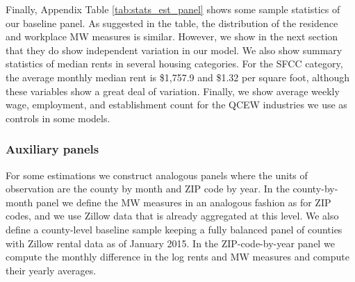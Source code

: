 Finally, Appendix Table \ref{tab:stats_est_panel} shows some sample statistics 
of our baseline panel.
As suggested in the table, the distribution of the residence and workplace MW 
measures is similar.
However, we show in the next section that they do show independent variation
in our model.
We also show summary statistics of median rents in several housing categories.
For the SFCC category, the average monthly median rent is \$1,757.9 and \$1.32 
per square foot, although these variables show a great deal of variation.
Finally, we show average weekly wage, employment, and establishment count 
for the QCEW industries we use as controls in some models.

\subsubsection*{Auxiliary panels}
\label{sec:data_aux_panels}

For some estimations we construct analogous panels where the units of 
observation are the county by month and ZIP code by year.
In the county-by-month panel we define the MW measures in an analogous fashion 
as for ZIP codes, and we use Zillow data that is already aggregated at this 
level.
We also define a county-level baseline sample keeping a fully balanced panel of 
counties with Zillow rental data as of January 2015.
In the ZIP-code-by-year panel we compute the monthly difference in the log rents 
and MW measures and compute their yearly averages.
